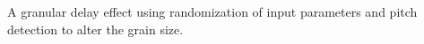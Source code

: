 A granular delay effect using randomization of input parameters and pitch detection to alter the grain size. 